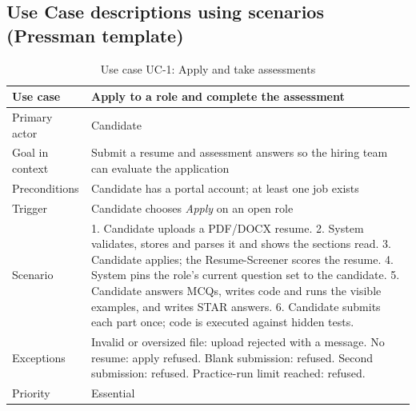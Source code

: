 \subsection{Use Case descriptions using scenarios (Pressman template)}
\begin{table}[H]\centering\small\caption{Use case UC-1: Apply and take assessments}
\begin{tabular}{|p{3.2cm}|p{11cm}|}\hline
Use case & Apply to a role and complete the assessment\\ \hline
Primary actor & Candidate\\ \hline
Goal in context & Submit a resume and assessment answers so the hiring team can evaluate the application\\ \hline
Preconditions & Candidate has a portal account; at least one job exists\\ \hline
Trigger & Candidate chooses \emph{Apply} on an open role\\ \hline
Scenario & 1. Candidate uploads a PDF/DOCX resume. 2. System validates, stores and parses it and shows the sections read. 3. Candidate applies; the Resume-Screener scores the resume. 4. System pins the role's current question set to the candidate. 5. Candidate answers MCQs, writes code and runs the visible examples, and writes STAR answers. 6. Candidate submits each part once; code is executed against hidden tests.\\ \hline
Exceptions & Invalid or oversized file: upload rejected with a message. No resume: apply refused. Blank submission: refused. Second submission: refused. Practice-run limit reached: refused.\\ \hline
Priority & Essential\\ \hline
\end{tabular}\end{table}

